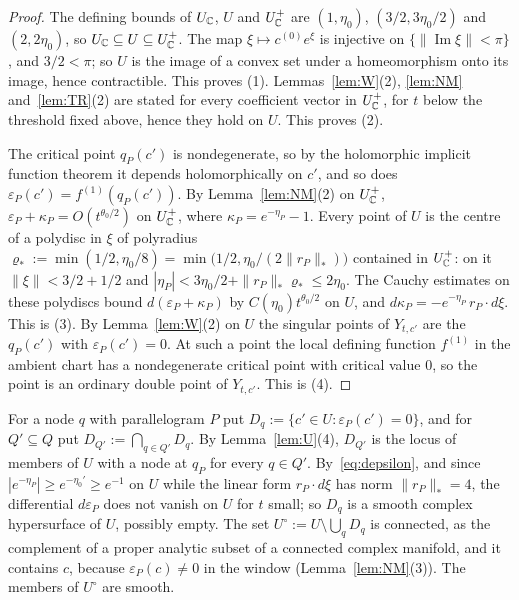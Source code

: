 \begin{proof}
The defining bounds of $U_\mathbb C$, $U$ and $U^+_\mathbb C$ are $(1,\eta_0)$, $(3/2,3\eta_0/2)$ and $(2,2\eta_0)$, so
$U_\mathbb C\subseteq U\subseteq U^+_\mathbb C$. The map $\xi\mapsto c^{(0)}e^\xi$ is injective on $\{\|\operatorname{Im}\xi\|<\pi\}$, and
$3/2<\pi$; so $U$ is the image of a convex set under a homeomorphism onto its image, hence contractible. This proves
(1). Lemmas~\ref{lem:W}(2), \ref{lem:NM} and~\ref{lem:TR}(2) are stated for every coefficient vector in $U^+_\mathbb C$, for $t$
below the threshold fixed above, hence they hold on $U$. This proves (2).

The critical point $q_P(c')$ is nondegenerate, so by the holomorphic implicit function theorem it depends
holomorphically on $c'$, and so does $\varepsilon_P(c')=f^{(1)}(q_P(c'))$. By Lemma~\ref{lem:NM}(2) on $U^+_\mathbb C$,
$\varepsilon_P+\kappa_P=O(t^{\theta_0/2})$ on $U^+_\mathbb C$,
where $\kappa_P=e^{-\eta_P}-1$. Every point of $U$ is the centre of a polydisc in $\xi$ of polyradius
$\varrho_*:=\min(1/2,\eta_0/8)=\min\bigl(1/2,\eta_0/(2\|r_P\|_*)\bigr)$ contained in $U^+_\mathbb C$: on it
$\|\xi\|<3/2+1/2$ and $|\eta_P|<3\eta_0/2+\|r_P\|_*\varrho_*\le2\eta_0$. The Cauchy estimates on these polydiscs bound
$d(\varepsilon_P+\kappa_P)$ by $C(\eta_0)t^{\theta_0/2}$ on $U$, and $d\kappa_P=-e^{-\eta_P}\,r_P\cdot d\xi$. This is
(3). By Lemma~\ref{lem:W}(2) on $U$ the singular points of $Y_{t,c'}$ are the $q_P(c')$ with $\varepsilon_P(c')=0$. At
such a point the local defining function $f^{(1)}$ in the ambient chart has a nondegenerate critical point with critical
value $0$, so the point is an ordinary double point of $Y_{t,c'}$. This is (4).
\end{proof}

For a node $q$ with parallelogram $P$ put $D_q:=\{c'\in U:\varepsilon_P(c')=0\}$, and for $Q'\subseteq Q$ put
$D_{Q'}:=\bigcap_{q\in Q'}D_q$. By Lemma~\ref{lem:U}(4), $D_{Q'}$ is the locus of members of $U$ with a node at
$q_P$ for every $q\in Q'$. By~\eqref{eq:depsilon}, and since $|e^{-\eta_P}|\ge e^{-\eta_0'}\ge e^{-1}$ on $U$ while the
linear form $r_P\cdot d\xi$ has norm $\|r_P\|_*=4$, the differential $d\varepsilon_P$ does not vanish on $U$ for $t$ small;
so $D_q$ is a smooth complex hypersurface of $U$, possibly empty. The set $U^\circ:=U\setminus\bigcup_qD_q$ is connected,
as the complement of a proper analytic subset of a connected complex manifold, and it contains $c$, because
$\varepsilon_P(c)\neq0$ in the window (Lemma~\ref{lem:NM}(3)). The members of $U^\circ$ are smooth.

